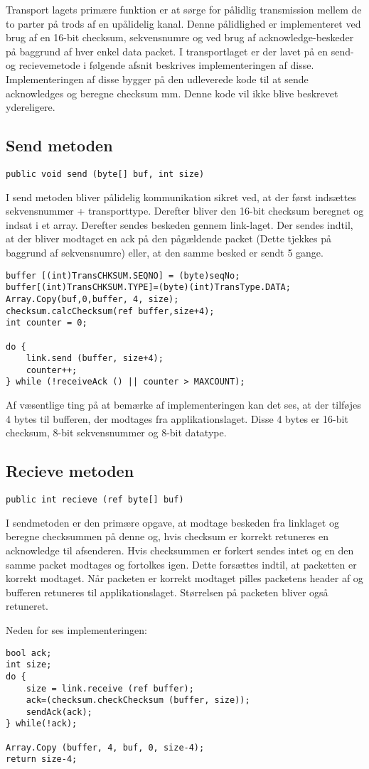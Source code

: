 Transport lagets primære funktion er at sørge for pålidlig transmission mellem de to parter på trods af en upålidelig kanal. 
Denne pålidlighed er implementeret ved brug af en 16-bit checksum, sekvensnumre og ved brug af acknowledge-beskeder på baggrund af hver enkel data packet. 
I transportlaget er der lavet på en send- og recievemetode i følgende afsnit beskrives implementeringen af disse. Implementeringen af disse bygger på den udleverede kode til at sende acknowledges og beregne checksum mm. Denne kode vil ikke blive beskrevet ydereligere.

\subsection{Send metoden}
\begin{verbatim}
public void send (byte[] buf, int size)
\end{verbatim}
I send metoden bliver pålidelig kommunikation sikret ved, at der først indsættes sekvensnummer + transporttype. Derefter bliver den 16-bit checksum beregnet og indsat i et array. Derefter sendes beskeden gennem link-laget. Der sendes indtil, at der bliver modtaget en ack på den pågældende packet (Dette tjekkes på baggrund af sekvensnumre) eller, at den samme besked er sendt 5 gange.
\begin{lstlisting}
buffer [(int)TransCHKSUM.SEQNO] = (byte)seqNo;
buffer[(int)TransCHKSUM.TYPE]=(byte)(int)TransType.DATA;
Array.Copy(buf,0,buffer, 4, size);
checksum.calcChecksum(ref buffer,size+4);
int counter = 0;

do {
	link.send (buffer, size+4);
	counter++;
} while (!receiveAck () || counter > MAXCOUNT);	
\end{lstlisting}

\noindent Af væsentlige ting på at bemærke af implementeringen kan det ses, at der tilføjes 4 bytes til bufferen, der modtages fra applikationslaget. Disse 4 bytes er 16-bit checksum, 8-bit sekvensnummer og 8-bit datatype. 

\subsection{Recieve metoden}
\begin{verbatim}
public int recieve (ref byte[] buf)
\end{verbatim}

I sendmetoden er den primære opgave, at modtage beskeden fra linklaget og beregne checksummen på denne og, hvis checksum er korrekt retuneres en acknowledge til afsenderen. Hvis checksummen er forkert sendes intet og en den samme packet modtages og fortolkes igen. Dette forsættes indtil, at packetten er korrekt modtaget. Når packeten er korrekt modtaget pilles packetens header af og bufferen retuneres til applikationslaget. Størrelsen på packeten bliver også retuneret.

\noindent Neden for ses implementeringen:
\begin{lstlisting}
bool ack;
int size;
do {
	size = link.receive (ref buffer);
	ack=(checksum.checkChecksum (buffer, size));
	sendAck(ack);
} while(!ack);

Array.Copy (buffer, 4, buf, 0, size-4);
return size-4;
\end{lstlisting}